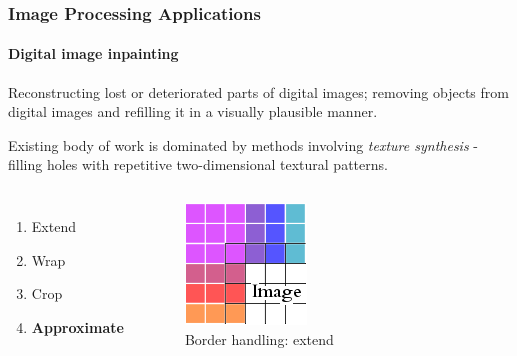 \documentclass{beamer}
\begin{document}
\begin{frame}
\frametitle{Image Processing Applications}
\framesubtitle{Digital image inpainting}

Reconstructing lost or deteriorated parts of digital images; removing objects from 
digital images and refilling it in a visually plausible manner.

Existing body of work is dominated by methods involving \textit{texture synthesis} - 
filling holes with repetitive two-dimensional textural patterns. 

\begin{columns}[c] %
\begin{enumerate}
	\item Extend 
	\item Wrap 
	\item Crop 
	\item \textbf{Approximate} 
\end{enumerate}
\begin{figure} %
\caption{Border handling: extend}
\centering
	\includegraphics[width=0.3\columnwidth]{../figures/Extend_Edge-Handling}
\end{figure}
\end{columns}
\end{frame}

\end{document}
